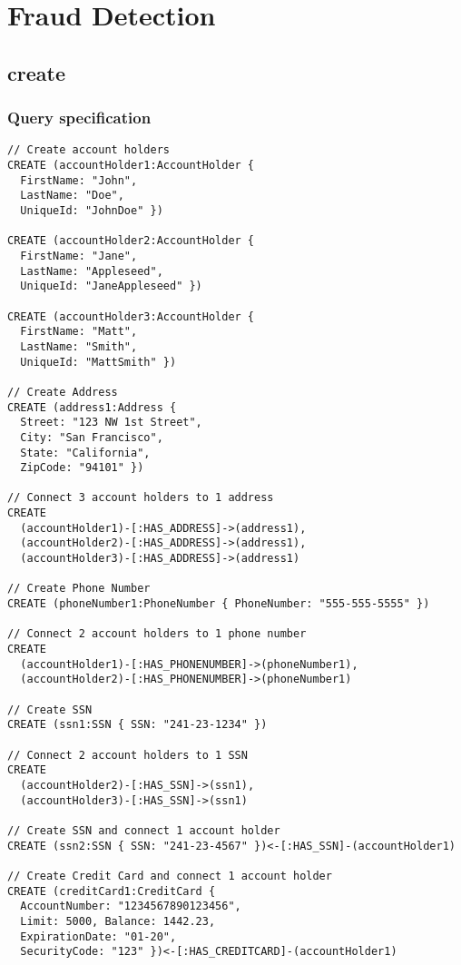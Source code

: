 \chapter{Fraud Detection}
\label{chp:fraud-detection}

\section{create}

\subsection*{Query specification}

\begin{lstlisting}
// Create account holders
CREATE (accountHolder1:AccountHolder {
  FirstName: "John",
  LastName: "Doe",
  UniqueId: "JohnDoe" })

CREATE (accountHolder2:AccountHolder {
  FirstName: "Jane",
  LastName: "Appleseed",
  UniqueId: "JaneAppleseed" })

CREATE (accountHolder3:AccountHolder {
  FirstName: "Matt",
  LastName: "Smith",
  UniqueId: "MattSmith" })

// Create Address
CREATE (address1:Address {
  Street: "123 NW 1st Street",
  City: "San Francisco",
  State: "California",
  ZipCode: "94101" })

// Connect 3 account holders to 1 address
CREATE
  (accountHolder1)-[:HAS_ADDRESS]->(address1),
  (accountHolder2)-[:HAS_ADDRESS]->(address1),
  (accountHolder3)-[:HAS_ADDRESS]->(address1)

// Create Phone Number
CREATE (phoneNumber1:PhoneNumber { PhoneNumber: "555-555-5555" })

// Connect 2 account holders to 1 phone number
CREATE
  (accountHolder1)-[:HAS_PHONENUMBER]->(phoneNumber1),
  (accountHolder2)-[:HAS_PHONENUMBER]->(phoneNumber1)

// Create SSN
CREATE (ssn1:SSN { SSN: "241-23-1234" })

// Connect 2 account holders to 1 SSN
CREATE
  (accountHolder2)-[:HAS_SSN]->(ssn1),
  (accountHolder3)-[:HAS_SSN]->(ssn1)

// Create SSN and connect 1 account holder
CREATE (ssn2:SSN { SSN: "241-23-4567" })<-[:HAS_SSN]-(accountHolder1)

// Create Credit Card and connect 1 account holder
CREATE (creditCard1:CreditCard {
  AccountNumber: "1234567890123456",
  Limit: 5000, Balance: 1442.23,
  ExpirationDate: "01-20",
  SecurityCode: "123" })<-[:HAS_CREDITCARD]-(accountHolder1)


\end{lstlisting}
